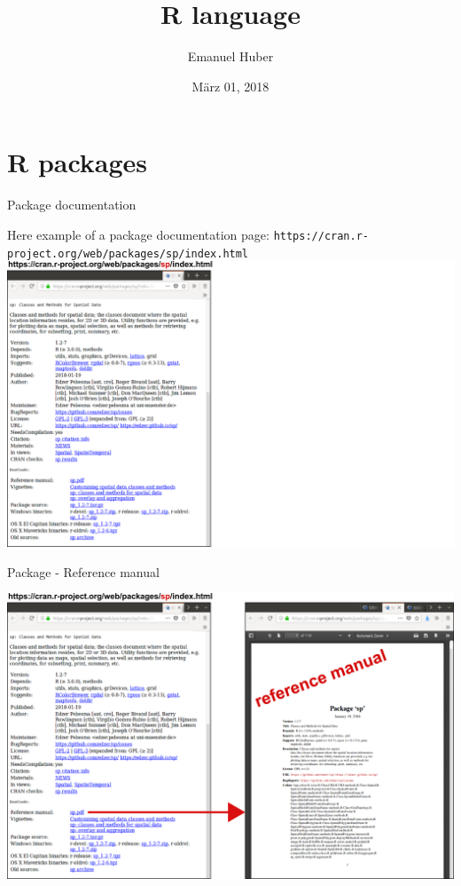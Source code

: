 \documentclass[8pt,ignorenonframetext,]{beamer}
\title{R language}
\author{Emanuel Huber}
\date{März 01, 2018}
\begin{document}
\frame{\titlepage}

\section{R packages}\label{r-packages}

\begin{frame}[fragile]{Package documentation}

Here example of a package documentation page:
\texttt{https://cran.r-project.org/web/packages/sp/index.html}
\includegraphics{imgPres/documentation_00.png}

\end{frame}

\begin{frame}{Package - Reference manual}

\includegraphics{imgPres/documentation_01.png}

\end{frame}
\end{document}
